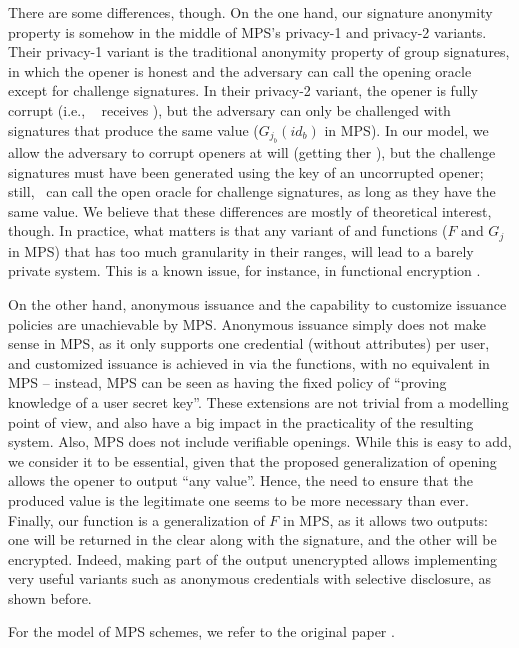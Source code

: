 There are some differences, though. On the one hand, our signature anonymity
property is somehow in the middle of MPS's privacy-1 and privacy-2 variants.
Their privacy-1 variant is the traditional anonymity property of group
signatures, in which the opener is honest and the adversary can call the opening
oracle except for challenge signatures. In their privacy-2 variant, the opener
is fully corrupt (i.e., \adv~ receives \osk), but the adversary can only be
challenged with signatures that produce the same \yinsp value ($G_{j_b}(id_b)$
in MPS). In our \UAS model, we allow the adversary to corrupt openers at will
(getting ther \osk), but the challenge signatures must have been generated using
the key of an uncorrupted opener; still, \adv~can call the open oracle for
challenge signatures, as long as they have the same \yinsp value. We believe
that these differences are mostly of theoretical interest, though. In practice,
what matters is that any variant of \feval and \finsp functions ($F$ and $G_j$
in MPS) that has too much granularity in their ranges, will lead to a barely
private system. This is a known issue, for instance, in functional encryption
\cite{bsw11}.

On the other hand, anonymous issuance and the capability to customize issuance
policies are unachievable by MPS. Anonymous issuance simply does not make sense
in MPS, as it only supports one credential (without attributes) per user, and
customized issuance is achieved in \UAS via the \fissue functions, with no
equivalent in MPS -- instead, MPS can be seen as having the fixed policy of
``proving knowledge of a user secret key''. These extensions are not trivial
from a modelling point of view, and also have a big impact in the practicality
of the resulting system. Also, MPS does not include verifiable openings. While
this is easy to add, we consider it to be essential, given that the proposed
generalization of opening allows the opener to output ``any value''. Hence, the
need to ensure that the produced value is the legitimate one seems to be more
necessary than ever. Finally, our \feval function is a generalization of $F$ in
MPS, as it allows two outputs: one will be returned in the clear along with the
signature, and the other will be encrypted. Indeed, making part of the output
unencrypted allows implementing very useful variants such as anonymous
credentials with selective disclosure, as shown before.

For the model of MPS schemes, we refer to the original paper \cite{ngsy22}.

